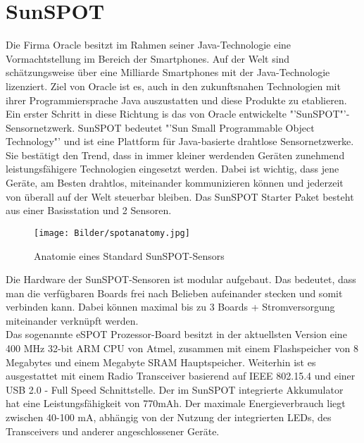 \section{SunSPOT}\label{s:Sunspot}

Die Firma Oracle besitzt im Rahmen seiner Java-Technologie eine Vormachtstellung im Bereich der Smartphones.
Auf der Welt sind schätzungsweise über eine Milliarde Smartphones mit der Java-Technologie lizenziert. Ziel von Oracle ist es, auch in den zukunftsnahen Technologien mit ihrer Programmiersprache Java auszustatten und diese Produkte zu etablieren.\\

Ein erster Schritt in diese Richtung is das von Oracle entwickelte "'SunSPOT"'-Sensornetzwerk. SunSPOT bedeutet "'Sun Small Programmable Object Technology"' und ist eine Plattform für Java-basierte drahtlose Sensornetzwerke. Sie bestätigt den Trend, dass in immer kleiner werdenden Geräten zunehmend leistungsfähigere Technologien eingesetzt werden. Dabei ist wichtig, dass jene Geräte, am Besten drahtlos, miteinander kommunizieren können und jederzeit von überall auf der Welt steuerbar bleiben. Das SunSPOT Starter Paket besteht aus einer Basisstation und 2 Sensoren.\\

\begin{figure}[H] 
	\centering
	\texttt{[image: Bilder/spotanatomy.jpg]}
	\caption{Anatomie eines Standard SunSPOT-Sensors}
	\label{f:spotaufbau}
\end{figure}

Die Hardware der SunSPOT-Sensoren ist modular aufgebaut. Das bedeutet, dass man die verfügbaren Boards frei nach Belieben aufeinander stecken und somit verbinden kann. Dabei können maximal bis zu 3 Boards + Stromversorgung miteinander verknüpft werden.\\

Das sogenannte eSPOT Prozessor-Board besitzt in der aktuellsten Version eine 400 MHz 32-bit ARM CPU von Atmel, zusammen mit einem Flashspeicher von 8 Megabytes und einem Megabyte SRAM Hauptspeicher. Weiterhin ist es ausgestattet mit einem Radio Transceiver basierend auf IEEE 802.15.4 und einer USB 2.0 - Full Speed Schnittstelle. Der im SunSPOT integrierte Akkumulator hat eine Leistungsfähigkeit von 770mAh. Der maximale Energieverbrauch liegt zwischen 40-100 mA, abhängig von der Nutzung der integrierten LEDs, des Transceivers und anderer angeschlossener Geräte.\\

